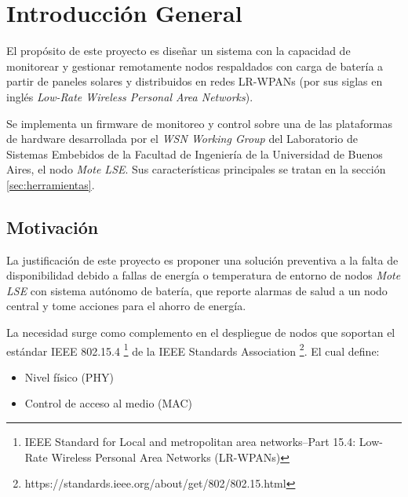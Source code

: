 
\chapter{Introducción General} %

\label{Chapter1} %
\label{IntroGeneral}


\newcommand{\keyword}[1]{\textbf{#1}}
\newcommand{\tabhead}[1]{\textbf{#1}}
\newcommand{\code}[1]{\texttt{#1}}
\newcommand{\file}[1]{\texttt{\bfseries#1}}
\newcommand{\option}[1]{\texttt{\itshape#1}}
\newcommand{\grados}{$^{\circ}$}


El propósito de este proyecto es diseñar un sistema con la capacidad de monitorear y gestionar remotamente nodos respaldados con carga de batería a partir de paneles solares y distribuidos en redes LR-WPANs (por sus siglas en inglés \textit{Low-Rate Wireless Personal Area Networks}).

Se implementa un firmware de monitoreo y control sobre una de las plataformas de hardware desarrollada por el \textit{WSN Working Group} del Laboratorio de Sistemas Embebidos de la Facultad de Ingeniería de la Universidad de Buenos Aires, el nodo \textit{Mote LSE}. Sus características principales se tratan en la sección \ref{sec:herramientas}.


\section{Motivación}
\label{sec:Motivación}

La justificación de este proyecto es proponer una solución preventiva a la falta de disponibilidad debido a fallas de energía o temperatura de entorno de nodos \textit{Mote LSE} con sistema autónomo de batería, que reporte alarmas de salud a un nodo central y tome acciones para el ahorro de energía.

La necesidad surge como complemento en el despliegue de nodos que soportan el estándar IEEE 802.15.4 \footnote{IEEE Standard for Local and metropolitan area networks--Part 15.4: Low-Rate Wireless Personal Area Networks (LR-WPANs)} de la IEEE Standards Association \footnote{https://standards.ieee.org/about/get/802/802.15.html}. El cual define:
		\begin{itemize}
			\item Nivel físico (PHY)
			\item Control de acceso al medio (MAC)
		\end{itemize}

